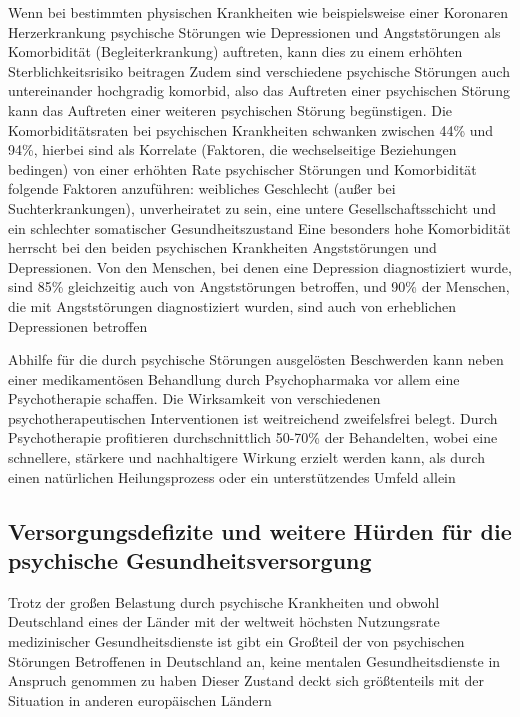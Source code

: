 Wenn bei bestimmten physischen Krankheiten wie beispielsweise einer Koronaren Herzerkrankung 
psychische Störungen wie Depressionen und Angststörungen als Komorbidität (Begleiterkrankung) auftreten, 
kann dies zu einem erhöhten Sterblichkeitsrisiko beitragen \cite[]{doering_persistent_2010} %
Zudem sind verschiedene psychische Störungen auch untereinander hochgradig komorbid, 
also das Auftreten einer psychischen Störung kann das Auftreten einer weiteren psychischen Störung begünstigen. 
Die Komorbiditätsraten bei psychischen Krankheiten schwanken zwischen 44\% und 94\%, 
hierbei sind als Korrelate (Faktoren, die wechselseitige Beziehungen bedingen) 
von einer erhöhten Rate psychischer Störungen und Komorbidität folgende Faktoren anzuführen: 
weibliches Geschlecht (außer bei Suchterkrankungen), unverheiratet zu sein, eine untere Gesellschaftsschicht 
und ein schlechter somatischer Gesundheitszustand \cite[]{jacobi_prevalence_2004} %
Eine besonders hohe Komorbidität herrscht bei den beiden psychischen Krankheiten Angststörungen und Depressionen. 
Von den Menschen, bei denen eine Depression diagnostiziert wurde, sind 85\% 
gleichzeitig auch von Angststörungen betroffen, und 90\% der Menschen, die mit Angststörungen diagnostiziert wurden,
sind auch von erheblichen Depressionen betroffen \cite[]{bakker_mental_2016} %


Abhilfe für die durch psychische Störungen ausgelösten Beschwerden kann neben einer medikamentösen Behandlung 
durch Psychopharmaka vor allem eine Psychotherapie schaffen. 
Die Wirksamkeit von verschiedenen psychotherapeutischen Interventionen ist weitreichend zweifelsfrei belegt. 
Durch Psychotherapie profitieren durchschnittlich 50-70\% der Behandelten, 
wobei eine schnellere, stärkere und nachhaltigere Wirkung erzielt werden kann, 
als durch einen natürlichen Heilungsprozess oder ein unterstützendes Umfeld allein 
\cite[S.55]{wagner_psychische_2021} %




\subsection{Versorgungsdefizite und weitere Hürden für die psychische Gesundheitsversorgung}\label{subsubsec:versorgungsdefizite}


Trotz der großen Belastung durch psychische Krankheiten und obwohl Deutschland eines der Länder mit der weltweit 
höchsten Nutzungsrate medizinischer Gesundheitsdienste ist \cite[]{mack_selfreported_2014} %
gibt ein Großteil der von psychischen Störungen Betroffenen in Deutschland an, 
keine mentalen Gesundheitsdienste in Anspruch genommen zu haben 
\cite[]{weisel_innovations_2021,mack_selfreported_2014} %
Dieser Zustand deckt sich größtenteils mit der Situation in anderen europäischen Ländern 
\cite[]{alonso_use_2004} %

